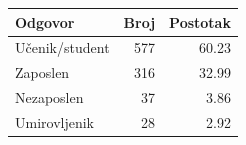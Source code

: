 \begin{tabular}{lrr}
\toprule
Odgovor & Broj & Postotak \\
\midrule
Učenik/student & 577 & 60.23 \\
Zaposlen & 316 & 32.99 \\
Nezaposlen & 37 & 3.86 \\
Umirovljenik & 28 & 2.92 \\
\bottomrule
\end{tabular}
